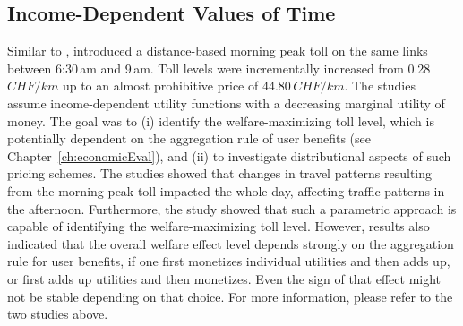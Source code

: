 \subsection{Income-Dependent Values of Time}
Similar to \citet{RieserEtAl_TRBTDF_2008}, \citet{KickhoeferEtAl2010EconomicEvaluationPublicAcceptanceRoadPricingKuhmo, Kickhoefer_PhDThesis_2014} introduced a distance-based morning peak toll on the same links between 6:30\,am and 9\,am. Toll levels were incrementally increased from 0.28\,$CHF/km$ up to an almost prohibitive price of 44.80\,$CHF/km$. The studies assume income-dependent utility functions with a decreasing marginal utility of money. The goal was to (i) identify the welfare-maximizing \citep[see e.g.,][Section~2.5]{TirachiniEtAl2012CrowdingCongestion}
toll level, which is potentially dependent on the aggregation rule of user benefits (see Chapter~\ref{ch:economicEval}), and (ii) to investigate distributional aspects of such pricing schemes.
%
The studies showed that changes in travel patterns resulting from the morning peak toll impacted the whole day, affecting traffic patterns in the afternoon.
%
Furthermore, the study showed that such a parametric approach is capable of identifying the welfare-maximizing toll level. However, results also indicated that the overall welfare effect level depends strongly on the aggregation rule for user benefits, \ie if one first monetizes individual utilities and then adds up, or first adds up utilities and then monetizes. 
Even the sign of that effect might not be stable depending on that choice.
%
For more information, please refer to the two studies above.


